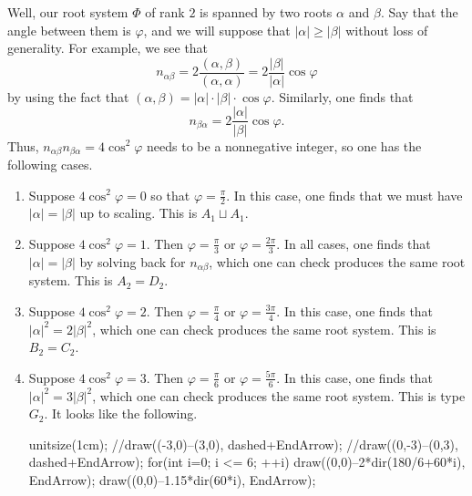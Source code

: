 \documentclass[../notes.tex]{subfiles}
\begin{document}
Well, our root system $\Phi$ of rank $2$ is spanned by two roots $\alpha$ and $\beta$. Say that the angle between them is $\varphi$, and we will suppose that $\left|\alpha\right|\ge\left|\beta\right|$ without loss of generality. For example, we see that
\[n_{\alpha\beta}=2\frac{(\alpha,\beta)}{(\alpha,\alpha)}=2\frac{\left|\beta\right|}{\left|\alpha\right|}\cos\varphi\]
by using the fact that $(\alpha,\beta)=\left|\alpha\right|\cdot\left|\beta\right|\cdot\cos\varphi$. Similarly, one finds that
\[n_{\beta\alpha}=2\frac{\left|\alpha\right|}{\left|\beta\right|}\cos\varphi.\]
Thus, $n_{\alpha\beta}n_{\beta\alpha}=4\cos^2\varphi$ needs to be a nonnegative integer, so one has the following cases.
\begin{enumerate}
	\item Suppose $4\cos^2\varphi=0$ so that $\varphi=\frac\pi2$. In this case, one finds that we must have $\left|\alpha\right|=\left|\beta\right|$ up to scaling. This is $A_1\sqcup A_1$.
	\item Suppose $4\cos^2\varphi=1$. Then $\varphi=\frac\pi3$ or $\varphi=\frac{2\pi}3$. In all cases, one finds that $\left|\alpha\right|=\left|\beta\right|$ by solving back for $n_{\alpha\beta}$, which one can check produces the same root system. This is $A_2=D_2$.
	\item Suppose $4\cos^2\varphi=2$. Then $\varphi=\frac\pi4$ or $\varphi=\frac{3\pi}4$. In this case, one finds that $\left|\alpha\right|^2=2\left|\beta\right|^2$, which one can check produces the same root system. This is $B_2=C_2$.
	\item Suppose $4\cos^2\varphi=3$. Then $\varphi=\frac{\pi}6$ or $\varphi=\frac{5\pi}6$. In this case, one finds that $\left|\alpha\right|^2=3\left|\beta\right|^2$, which one can check produces the same root system. This is type $G_2$. It looks like the following.
	\begin{center}
		\begin{asy}
			unitsize(1cm);
			//draw((-3,0)--(3,0), dashed+EndArrow);
			//draw((0,-3)--(0,3), dashed+EndArrow);
			for(int i=0; i <= 6; ++i)
			{
				draw((0,0)--2*dir(180/6+60*i), EndArrow);
				draw((0,0)--1.15*dir(60*i), EndArrow);
			}
		\end{asy}
	\end{center}
\end{enumerate}
\end{document}
